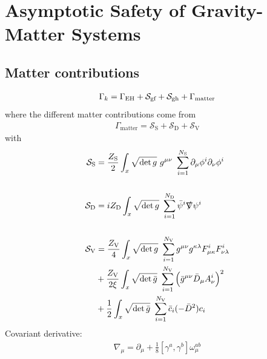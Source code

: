 \chapter{Asymptotic Safety of Gravity-Matter Systems}
\blindtext
\section{Matter contributions}
\begin{align}
	\Gamma_{k} = \Gamma_{\text{EH}} + \mathcal{S}_{\text{gf}}+ \mathcal{S}_{\text{gh}}+ \Gamma_{\text{matter}}
\end{align}
where the different matter contributions come from
\begin{align}
	\Gamma_{\text{matter}} = \mathcal{S}_{\text{S}} + \mathcal{S}_{\text{D}} + \mathcal{S}_{\text{V}} 
\end{align}
with 
\begin{align}
	\mathcal{S}_{\text{S}} &= \frac{Z_{\text{S}}}{2}\int_x \sqrt{\operatorname{det}g} \ g^{\mu\nu} \ \sum\limits_{i=1}^{N_{\text{S}}} \partial_{\mu}\phi^{i}\partial_{\nu}\phi^{i} \\
	\phantom{.}\nonumber\\
	\mathcal{S}_{\text{D}} &= iZ_{\text{D}}\int_x \sqrt{\operatorname{det}g} \ \sum\limits_{i=1}^{N_{\text{D}}} \bar{\psi}^{i}\slashed{\nabla}\psi^{i}\\
	\phantom{.}\nonumber\\
		\mathcal{S}_{\text{V}} &= \frac{Z_{\text{V}}}{4}\int_x \sqrt{\operatorname{det}g} \ \sum\limits_{i=1}^{N_{\text{V}}} g^{\mu\nu}g^{\kappa\lambda}F^{i}_{\mu\kappa}F^{i}_{\nu\lambda} \nonumber \\
		&+ \frac{Z_{\text{V}}}{2\xi}\int_x \sqrt{\operatorname{det}\bar{g}} \ \sum\limits_{i=1}^{N_{\text{V}}} \left(\bar{g}^{\mu\nu}\bar{D}_{\mu}A_{\nu}^{i}\right)^2  \\
		&+ \frac{1}{2}\int_x \sqrt{\operatorname{det}\bar{g}} \ \sum\limits_{i=1}^{N_{\text{V}}} \bar{c}_i(-\bar{D}^2)c_i \nonumber
\end{align}
Covariant derivative:
\begin{align}
	\nabla_{\mu} = \partial_{\mu} + \frac{1}{8}\left[\gamma^{a}, \gamma^{b}\right]\omega_{\mu}^{ab}
\end{align}
\blindtext
